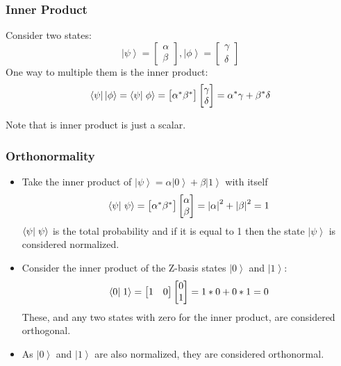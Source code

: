 \documentclass{beamer}
\newcommand{\bra}[1]{\ensuremath{\left\langle#1\right|}}
\newcommand{\ket}[1]{\ensuremath{\left|#1\right\rangle}}
\newcommand{\bracket}[2]{\ensuremath{\left\langle#1 \vphantom{#2}\right| \left. #2 \vphantom{#1}\right\rangle}}
\begin{document}
\begin{frame}\frametitle{Inner Product}
Consider two states:
\[\ket{\psi} = \begin{bmatrix} \alpha \\ \beta \end{bmatrix}, \ket{\phi} = \begin{bmatrix} \gamma \\ \delta \end{bmatrix} \]
One way to multiple them is the inner product:
\[\bra{\psi} \ket{\phi} = \bracket{\psi}{\phi} = \begin{bmatrix} \alpha^{*} \beta^{*} \end{bmatrix} \begin{bmatrix} \gamma \\ \delta \end{bmatrix} = \alpha^{*} \gamma + \beta^{*} \delta\]

Note that is inner product is just a scalar.
\end{frame}

\begin{frame}\frametitle{Orthonormality}
\begin{itemize}
\item Take the inner product of $\ket{\psi} =  \alpha \ket{0} + \beta \ket{1}$ with itself
\[\bracket{\psi}{\psi} = \begin{bmatrix} \alpha^{*} \beta^{*} \end{bmatrix} \begin{bmatrix} \alpha \\ \beta \end{bmatrix}= \left| \alpha \right|^2 + \left| \beta \right|^2 = 1 \]
$\bracket{\psi}{\psi}$ is the total probability and if it is equal to 1 then the state $\ket{\psi}$ is considered normalized.
\item Consider the inner product of the Z-basis states $\ket{0}$ and $\ket{1}$:
\[\bracket{0}{1} = \begin{bmatrix} 1 \quad 0 \end{bmatrix} \begin{bmatrix} 0 \\ 1 \end{bmatrix} = 1*0 + 0*1 = 0\]
These, and any two states with zero for the inner product, are considered orthogonal. 
\item As $\ket{0}$ and $\ket{1}$ are also normalized, they are considered orthonormal. 
\end{itemize}
\end{frame}
\end{document}
